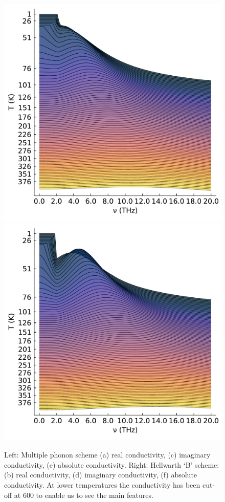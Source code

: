 \begin{figure}
    \includegraphics[width=.49\textwidth]{figures/multi_plot_temp_abs.pdf}
    \includegraphics[width=.49\textwidth]{figures/B_plot_temp_abs.pdf}
    \caption{Left: Multiple phonon scheme (a) real conductivity, (c) imaginary conductivity, (e) absolute conductivity. Right: Hellwarth `B' scheme: (b) real conductivity, (d) imaginary conductivity, (f) absolute conductivity. At lower temperatures the conductivity has been cut-off at $600$ to enable us to see the main features.}
    \label{fig:multiridge}
\end{figure}

